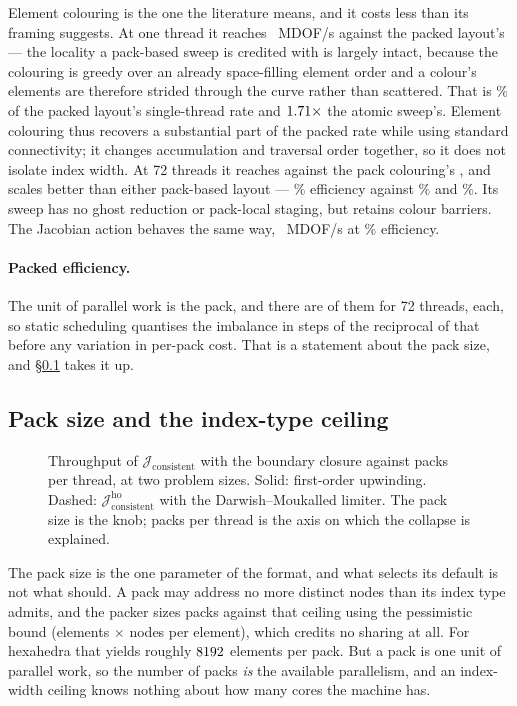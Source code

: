 \documentclass[sigconf,nonacm]{acmart}
\newcommand{\Jex}{\mathcal{J}_{\mathrm{consistent}}}
\newcommand{\Jhoex}{\mathcal{J}^{\mathrm{ho}}_{\mathrm{consistent}}}
\begin{document}
Element colouring is the one the literature means, and it costs less than its framing suggests.
At one thread it reaches \scaleEcolorResOne{}~MDOF/s against the packed layout's
\scalePackedResOne{} --- the locality a pack-based sweep is credited with is largely intact,
because the colouring is greedy over an already space-filling element order and a colour's
elements are therefore strided through the curve rather than scattered. That is \scaleEcolorOfPackedOnePct\% of the packed
layout's single-thread rate and $1.71\times$ the atomic sweep's.
Element colouring thus recovers a substantial part of the packed rate while using standard
connectivity; it changes accumulation and traversal order together, so it does not isolate
index width. At 72 threads it reaches
\scaleEcolorResTop{} against the pack colouring's \scaleColoredResTop{}, and scales better than
either pack-based layout --- \scaleEcolorResEff\% efficiency against \scalePackedResEff\% and
\scaleColoredResEff\%. Its sweep has no ghost reduction or pack-local staging, but retains
colour barriers. The Jacobian action behaves the same way, \scaleEcolorJacTop{}~MDOF/s at
\scaleEcolorJacEff\% efficiency.

\paragraph{Packed efficiency.} The unit of parallel work is the pack, and there are
\scalePacks{} of them for 72 threads, \scalePacksPerThread{} each, so static scheduling
quantises the imbalance in steps of the reciprocal of that before any variation in per-pack cost. That is a
statement about the pack size, and \S\ref{sec:res:packsize}
takes it up.

\subsection{Pack size and the index-type ceiling}
\label{sec:res:packsize}

\begin{figure}[t]
  \centering
  
  \caption{Throughput of $\Jex$ with the boundary closure against packs per thread, at two
    problem sizes. Solid: first-order upwinding. Dashed: $\Jhoex$ with the Darwish--Moukalled
    limiter. The pack size is the
    knob; packs per thread is the axis on which the collapse is explained.}
  \label{fig:packsize}
\end{figure}

The pack size is the one parameter of the format, and what selects its default is not what
should. A pack may address no more distinct nodes than its index type admits, and the packer
sizes packs against that ceiling using the pessimistic bound (elements $\times$ nodes per
element), which credits no sharing at all. For hexahedra that yields roughly
$8192{}$ elements per pack. But a pack is one unit of parallel work, so the number of
packs \emph{is} the available parallelism, and an index-width ceiling knows nothing about how
many cores the machine has.
\end{document}
